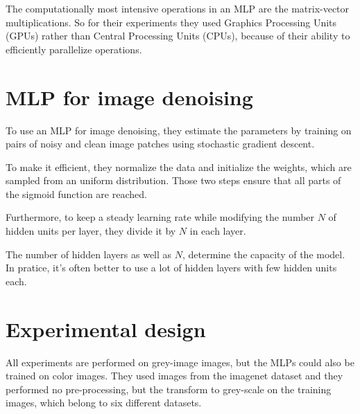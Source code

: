 \documentclass[10pt,a4paper]{article}
\newcommand{\svs}{\vspace{9pt}}
\begin{document}
\svs 

The computationally most intensive operations in an MLP are the matrix-vector multiplications. So for their experiments they used Graphics Processing Units (GPUs) rather than Central Processing Units (CPUs), because of their ability to efficiently parallelize operations.


\svs







\section{MLP for image denoising}


To use an MLP for image denoising, they estimate the parameters by training on pairs of noisy and clean image patches using stochastic gradient descent. 


\svs

To make it efficient, they normalize the data and initialize the weights, which are sampled from an uniform distribution. Those two steps ensure that all parts of the sigmoid function are reached.

\svs

Furthermore, to keep a steady learning rate while modifying the number $N$ of hidden units per layer, they divide it by $N$ in each layer.

\svs

The number of hidden layers as well as $N$, determine the capacity of the model. In pratice, it's often better to use a lot of hidden layers with few hidden units each.

\svs

\section{Experimental design}

All experiments are performed on grey-image images, but the MLPs could also be trained on color images. They used images from the imagenet dataset and they performed no pre-processing, but the transform to grey-scale on the training images, which belong to six different datasets.
\end{document}
